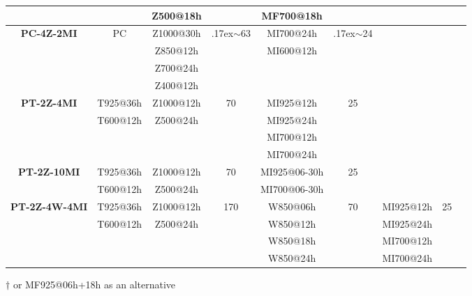 \documentclass[review]{elsarticle}
\begin{document}
\begin{table*}[h]
\begin{center}
\begin{tabular}{ccccccccl}
			&& Z500@18h && MF700@18h &&&& \\
			\hline 
			\textbf{PC-4Z-2MI} & PC & Z1000@30h & {\raise.17ex\hbox{$\scriptstyle\sim$}}63 & MI700@24h & {\raise.17ex\hbox{$\scriptstyle\sim$}}24 &&& \citealt{Horton2018a}\\
			&& Z850@12h && MI600@12h &&&& \\
			&& Z700@24h &&&&&& \\
			&& Z400@12h &&&&&& \\
			\hline 
			\textbf{PT-2Z-4MI} & T925@36h & Z1000@12h & 70 & MI925@12h & 25 &&& \citealt{BenDaoud2016} \\
			& T600@12h & Z500@24h && MI925@24h &&&& \\
			&&&& MI700@12h &&&& \\
			&&&& MI700@24h &&&& \\
			\hline 
			\textbf{PT-2Z-10MI} & T925@36h & Z1000@12h & 70 & MI925@06-30h & 25 &&& \citealt{BenDaoud2010} \\
			& T600@12h & Z500@24h && MI700@06-30h &&&& \\
			\hline 
			\textbf{PT-2Z-4W-4MI} & T925@36h & Z1000@12h & 170 & W850@06h & 70 & MI925@12h & 25 & \citealt{BenDaoud2016} \\
			& T600@12h & Z500@24h && W850@12h && MI925@24h && \\
			&&&& W850@18h && MI700@12h && \\
			&&&& W850@24h && MI700@24h && \\
			\hline 
		\end{tabular} 
	\end{center}
	
	$\dagger$ or MF925@06h+18h as an alternative
	\label{table:methods}
\end{table*}
\clearpage
\end{document}
